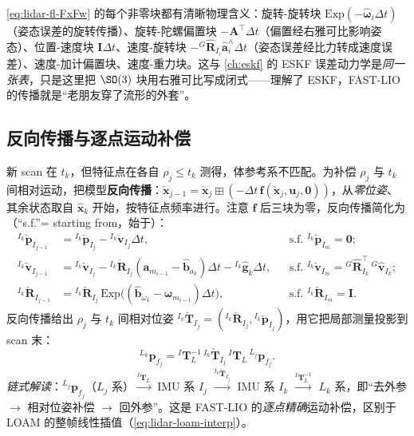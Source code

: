 \begin{insight}
\cref{eq:lidar-fl-FxFw} 的每个非零块都有清晰物理含义：旋转-旋转块 $\mathrm{Exp}(-\hat{\boldsymbol{\omega}}_i\Delta t)$（姿态误差的旋转传播）、旋转-陀螺偏置块 $-\mathbf{A}^\top\Delta t$（偏置经右雅可比影响姿态）、位置-速度块 $\mathbf{I}\Delta t$、速度-旋转块 $-{}^G\hat{\mathbf{R}}_{I_i}\hat{\mathbf{a}}_i^\wedge\Delta t$（姿态误差经比力转成速度误差）、速度-加计偏置块、速度-重力块。这与 \cref{ch:eskf} 的 ESKF 误差动力学是\emph{同一张表}，只是这里把 $\SO(3)$ 块用右雅可比写成闭式——理解了 ESKF，FAST-LIO 的传播就是“老朋友穿了流形的外套”。
\end{insight}

\subsection{反向传播与逐点运动补偿}
\label{sec:lidar-fl-bwd}

新 scan 在 $t_k$，但特征点在各自 $\rho_j\le t_k$ 测得，体参考系不匹配。为补偿 $\rho_j$ 与 $t_k$ 间相对运动，把模型\textbf{反向传播}\cite{xu2021fastlio}：$\check{\mathbf{x}}_{j-1}=\check{\mathbf{x}}_j\boxplus(-\Delta t\,\mathbf{f}(\check{\mathbf{x}}_j,\mathbf{u}_j,\mathbf{0}))$，从\emph{零位姿}、其余状态取自 $\hat{\mathbf{x}}_k$ 开始，按特征点频率进行。注意 $\mathbf{f}$ 后三块为零，反向传播简化为（“s.f.”= starting from，始于）：
\begin{equation}
\begin{aligned}
{}^{I_k}\check{\mathbf{p}}_{I_{j-1}}&={}^{I_k}\check{\mathbf{p}}_{I_j}-{}^{I_k}\check{\mathbf{v}}_{I_j}\Delta t, &&\text{s.f. }{}^{I_k}\check{\mathbf{p}}_{I_m}=\mathbf{0};\\
{}^{I_k}\check{\mathbf{v}}_{I_{j-1}}&={}^{I_k}\check{\mathbf{v}}_{I_j}-{}^{I_k}\check{\mathbf{R}}_{I_j}(\mathbf{a}_{m_{i-1}}-\hat{\mathbf{b}}_{a_k})\Delta t-{}^{I_k}\hat{\mathbf{g}}_k\Delta t, &&\text{s.f. }{}^{I_k}\check{\mathbf{v}}_{I_m}={}^G\hat{\mathbf{R}}_{I_k}^\top\,{}^G\hat{\mathbf{v}}_{I_k};\\
{}^{I_k}\check{\mathbf{R}}_{I_{j-1}}&={}^{I_k}\check{\mathbf{R}}_{I_j}\,\mathrm{Exp}\big((\hat{\mathbf{b}}_{\omega_k}-\boldsymbol{\omega}_{m_{i-1}})\Delta t\big), &&\text{s.f. }{}^{I_k}\check{\mathbf{R}}_{I_m}=\mathbf{I}.
\end{aligned}
\label{eq:lidar-fl-bwd}
\end{equation}
反向传播给出 $\rho_j$ 与 $t_k$ 间相对位姿 ${}^{I_k}\check{\mathbf{T}}_{I_j}=({}^{I_k}\check{\mathbf{R}}_{I_j},{}^{I_k}\check{\mathbf{p}}_{I_j})$，用它把局部测量投影到 scan 末：
\begin{equation}
  {}^{L_k}\mathbf{p}_{f_j}={}^I\mathbf{T}_L^{-1}\,{}^{I_k}\check{\mathbf{T}}_{I_j}\,{}^I\mathbf{T}_L\,{}^{L_j}\mathbf{p}_{f_j}.
  \label{eq:lidar-fl-project}
\end{equation}
\emph{链式解读}：${}^{L_j}\mathbf{p}_{f_j}$（$L_j$ 系）$\xrightarrow{{}^I\mathbf{T}_L}$ IMU 系 $I_j$ $\xrightarrow{{}^{I_k}\check{\mathbf{T}}_{I_j}}$ IMU 系 $I_k$ $\xrightarrow{{}^I\mathbf{T}_L^{-1}}$ $L_k$ 系，即“去外参 $\to$ 相对位姿补偿 $\to$ 回外参”。这是 FAST-LIO 的\emph{逐点精确}运动补偿，区别于 LOAM 的整帧线性插值（\cref{eq:lidar-loam-interp}）。

